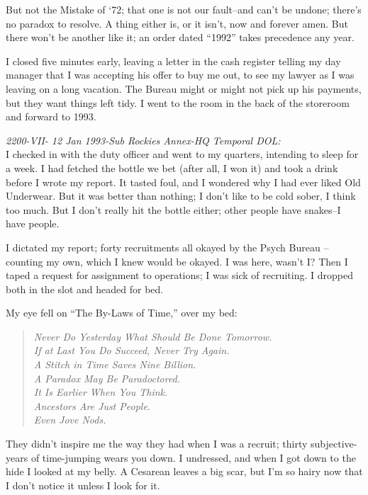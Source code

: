 But not the  Mistake  of `72;  that  one  is  not  our
fault--and  can't  be  undone;  there's no paradox to resolve. A
thing either is, or it isn't, now and forever amen.  But  there
won't   be  another  like  it;  an  order  dated  ``1992''  takes
precedence any year.

I closed five minutes early, leaving a  letter  in  the
cash  register  telling my day manager that I was accepting his
offer to buy me out, to see my lawyer as I  was  leaving  on  a
long  vacation.  The  Bureau  might  or  might  not pick up his
payments, but they want things left tidy. I went to the room in
the back of the storeroom and forward to 1993.

\emph{2200-VII- 12 Jan  1993-Sub  Rockies  Annex-HQ  Temporal DOL:}\\
I  checked  in  with  the  duty  officer  and  went to my
quarters, intending to sleep for a  week.  I  had  fetched  the
bottle  we  bet (after all, I won it) and took a drink before I
wrote my report. It tasted foul, and I wondered why I had  ever
liked  Old  Underwear.  But it was better than nothing; I don't
like to be cold sober, I think too much. But I don't really hit
the bottle either; other people have snakes--I have people.

I dictated my report; forty recruitments all okayed  by
the  Psych  Bureau  --  counting  my  own, which I knew would be
okayed. I was here, wasn't  I?  Then  I  taped  a  request  for
assignment  to  operations; I was sick of recruiting. I dropped
both in the slot and headed for bed.

My eye fell on ``The By-Laws of Time,'' over my bed:

\begin{verse}
\itshape
        Never Do Yesterday What Should Be Done Tomorrow.\\
        If at Last You Do Succeed, Never Try Again.\\
        A Stitch in Time Saves Nine Billion.\\
        A Paradox May Be Paradoctored.\\
        It Is Earlier When You Think.\\
        Ancestors Are Just People.\\
        Even Jove Nods.\\
\end{verse}

They didn't inspire me the way they had when  I  was  a
recruit;  thirty  subjective-years  of  time-jumping  wears you
down. I undressed, and when I got down to the hide I looked  at
my  belly.  A  Cesarean leaves a big scar, but I'm so hairy now
that I don't notice it unless I look for it.

